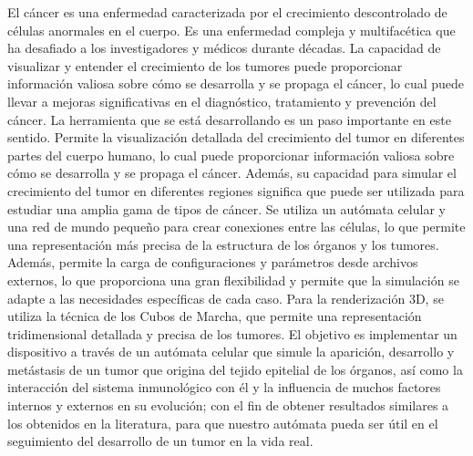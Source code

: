 \begin{resumen}
El cáncer es una enfermedad caracterizada por el crecimiento descontrolado de células anormales en el cuerpo. Es una enfermedad compleja y multifacética que ha desafiado a los investigadores y médicos durante décadas. La capacidad de visualizar y entender el crecimiento de los tumores puede proporcionar información valiosa sobre cómo se desarrolla y se propaga el cáncer, lo cual puede llevar a mejoras significativas en el diagnóstico, tratamiento y prevención del cáncer. La herramienta que se está desarrollando es un paso importante en este sentido. Permite la visualización detallada del crecimiento del tumor en diferentes partes del cuerpo humano, lo cual puede proporcionar información valiosa sobre cómo se desarrolla y se propaga el cáncer. Además, su capacidad para simular el crecimiento del tumor en diferentes regiones significa que puede ser utilizada para estudiar una amplia gama de tipos de cáncer. Se utiliza un autómata celular y una red de mundo pequeño para crear conexiones entre las células, lo que permite una representación más precisa de la estructura de los órganos y los tumores. Además, permite la carga de configuraciones y parámetros desde archivos externos, lo que proporciona una gran flexibilidad y permite que la simulación se adapte a las necesidades específicas de cada caso. Para la renderización 3D, se utiliza la técnica de los Cubos de Marcha, que permite una representación tridimensional detallada y precisa de los tumores. El objetivo es implementar un dispositivo a través de un autómata celular que simule la aparición, desarrollo y metástasis de un tumor que origina del tejido epitelial de los órganos, así como la interacción del sistema inmunológico con él y la influencia de muchos factores internos y externos en su evolución; con el fin de obtener resultados similares a los obtenidos en la literatura, para que nuestro autómata pueda ser útil en el seguimiento del desarrollo de un tumor en la vida real.
\end{resumen}

